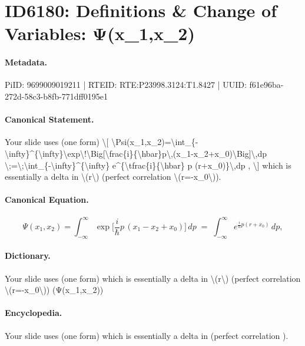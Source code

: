 \section*{ID6180: Definitions \& Change of Variables: Ψ(x\_1,x\_2)}
\paragraph{Metadata.}
PiID: 9699009019211 | RTEID: RTE:P23998.3124:T1.8427 | UUID: f61e96ba-272d-58c3-b8fb-771dff0195e1

\paragraph{Canonical Statement.}
Your slide uses (one form) \textbackslash{}[ \textbackslash{}Psi(x\_1,x\_2)=\textbackslash{}int\_\{-\textbackslash{}infty\}\textasciicircum{}\{\textbackslash{}infty\}\textbackslash{}exp\textbackslash{}!\textbackslash{}Big[\textbackslash{}frac\{i\}\{\textbackslash{}hbar\}p\textbackslash{},(x\_1-x\_2+x\_0)\textbackslash{}Big]\textbackslash{},dp \textbackslash{};=\textbackslash{};\textbackslash{}int\_\{-\textbackslash{}infty\}\textasciicircum{}\{\textbackslash{}infty\} e\textasciicircum{}\{\textbackslash{}tfrac\{i\}\{\textbackslash{}hbar\} p (r+x\_0)\}\textbackslash{},dp , \textbackslash{}] which is essentially a delta in \textbackslash{}(r\textbackslash{}) (perfect correlation \textbackslash{}(r=-x\_0\textbackslash{})).

\paragraph{Canonical Equation.}
\[
\Psi(x_1,x_2)=\int_{-\infty}^{\infty}\exp\!\Big[\frac{i}{\hbar}p\,(x_1-x_2+x_0)\Big]\,dp \;=\;\int_{-\infty}^{\infty} e^{\tfrac{i}{\hbar} p (r+x_0)}\,dp ,
\]

\paragraph{Dictionary.}
Your slide uses (one form) which is essentially a delta in \textbackslash{}(r\textbackslash{}) (perfect correlation \textbackslash{}(r=-x\_0\textbackslash{})) (Ψ(x\_1,x\_2))

\paragraph{Encyclopedia.}
Your slide uses (one form) which is essentially a delta in (perfect correlation ).

